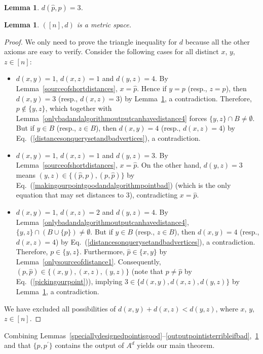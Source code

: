 \documentclass[letterpaper,12pt]{article}
\newtheorem{lemma}[theorem]{Lemma}
\begin{document}
{\begin{lemma}\label{distancebetweennonbadoutputandourdesignedpoint}
$d(\hat{p},p)=3$.
\end{lemma}

\begin{lemma}\label{constructeddistanceismetric}
$([n],d)$ is a metric space.
\end{lemma}
\begin{proof}
We only need to prove the triangle inequality for $d$ because all the other
axioms
are easy to verify.
Consider
the following cases for all distinct $x$, $y$, $z\in[n]$:
\begin{itemize}
\item $d(x,y)=1$, $d(x,z)=1$ and $d(y,z)=4$.
By Lemma~\ref{sourceofshortdistances},
$x=\hat{p}$.
Hence if $y=p$ (resp., $z=p$), then $d(x,y)=3$ (resp., $d(x,z)=3$)
by
Lemma~\ref{distancebetweennonbadoutputandourdesignedpoint},
a
contradiction.
Therefore, $p\notin\{y,z\}$, which together with
Lemma~\ref{onlybadandalgorithmoutputcanhavedistance4} forces $\{y,z\}\cap
B\neq\emptyset$.
But
if
$y\in B$ (resp., $z\in B$), then
$d(x,y)=4$ (resp., $d(x,z)=4$)
by Eq.~(\ref{distancesonquerysetandbadvertices}), a contradiction.
\item $d(x,y)=1$, $d(x,z)=1$ and $d(y,z)=3$.
By Lemma~\ref{sourceofshortdistances},
$x=\hat{p}$.
On the other hand, $d(y,z)=3$ means $(y,z)\in\{(\hat{p},p),(p,\hat{p})\}$ by
Eq.~(\ref{makingourpointgoodandalgorithmpointbad}) (which is the only
equation that may set distances to $3$),
contradicting $x=\hat{p}$.
\item $d(x,y)=1$, $d(x,z)=2$ and $d(y,z)=4$.
By Lemma~\ref{onlybadandalgorithmoutputcanhavedistance4},
$\{y,z\}\cap(B\cup\{p\})\neq\emptyset$.
But if $y\in B$ (resp., $z\in B$), then $d(x,y)=4$ (resp., $d(x,z)=4$) by
Eq.~(\ref{distancesonquerysetandbadvertices}), a contradiction.
Therefore, $p\in\{y,z\}$.
Furthermore, $\hat{p}\in\{x,y\}$ by Lemma~\ref{onlysourceofdistance1}.
Consequently, $(p,\hat{p})\in\{(x,y),(x,z),(y,z)\}$
(note that $p\neq \hat{p}$ by Eq.~(\ref{pickingourpoint})),
implying $3\in\{d(x,y),d(x,z),d(y,z)\}$
by
Lemma~\ref{distancebetweennonbadoutputandourdesignedpoint},
a contradiction.
\end{itemize}
We have excluded all possibilities of $d(x,y)+d(x,z)<d(y,z)$, where
$x$, $y$, $z\in[n]$.
\end{proof}


Combining
Lemmas~\ref{speciallydesignedpointisgood}--\ref{outputpointisterribleifbad},~\ref{constructeddistanceismetric}
and that
$\{p,p^\prime\}$ contains the output of $A^d$
yields our main theorem.

}
\end{document}
